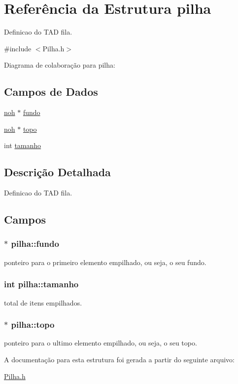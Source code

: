 \hypertarget{structpilha}{\section{Referência da Estrutura pilha}
\label{structpilha}
}


Definicao do T\+A\+D fila.  




{\ttfamily \#include $<$Pilha.\+h$>$}



Diagrama de colaboração para pilha\+:
\subsection*{Campos de Dados}
\begin{DoxyCompactItemize}
\item 
\hyperlink{Noh_8h_a0d7ef1758ed4704552e1e2020f126654}{noh} $\ast$ \hyperlink{structpilha_aefa51c1937df509cba48dbfb6784fd96}{fundo}
\item 
\hyperlink{Noh_8h_a0d7ef1758ed4704552e1e2020f126654}{noh} $\ast$ \hyperlink{structpilha_ab1f3f0694d5334af3f5dc0596b728316}{topo}
\item 
int \hyperlink{structpilha_afe4a242abd51f12ad1acdccbfd5e8b8d}{tamanho}
\end{DoxyCompactItemize}


\subsection{Descrição Detalhada}
Definicao do T\+A\+D fila. 

\subsection{Campos}
\hypertarget{structpilha_aefa51c1937df509cba48dbfb6784fd96}{
\subsubsection[{fundo}]{$\ast$ pilha\+::fundo}}\label{structpilha_aefa51c1937df509cba48dbfb6784fd96}
ponteiro para o primeiro elemento empilhado, ou seja, o seu fundo. \hypertarget{structpilha_afe4a242abd51f12ad1acdccbfd5e8b8d}{
\subsubsection[{tamanho}]{\setlength{\rightskip}{0pt plus 5cm}int pilha\+::tamanho}}\label{structpilha_afe4a242abd51f12ad1acdccbfd5e8b8d}
total de itens empilhados. \hypertarget{structpilha_ab1f3f0694d5334af3f5dc0596b728316}{
\subsubsection[{topo}]{$\ast$ pilha\+::topo}}\label{structpilha_ab1f3f0694d5334af3f5dc0596b728316}
ponteiro para o ultimo elemento empilhado, ou seja, o seu topo. 

A documentação para esta estrutura foi gerada a partir do seguinte arquivo\+:\begin{DoxyCompactItemize}
\item 
\hyperlink{Pilha_8h}{Pilha.\+h}\end{DoxyCompactItemize}
